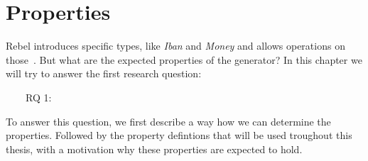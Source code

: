 \chapter{Properties}
\label{cpt:4_properties}



Rebel introduces specific types, like \textit{Iban} and \textit{Money} and
allows operations on those~\cite{stoel2016solving}. But what are the expected
properties of the generator? In this chapter we will try to answer the first
research question:
\begin{description}
	\item [~~~~RQ 1:] \rqOne
\end{description}
To answer this question, we first describe a way how we can determine the
properties. Followed by the property defintions that will be used troughout this
thesis, with a motivation why these properties are expected to hold.


